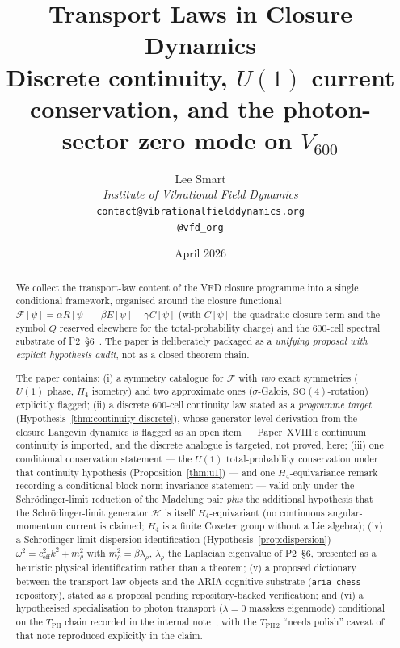 \documentclass[11pt]{article}
\title{Transport Laws in Closure Dynamics\\[6pt]
\large Discrete continuity, $U(1)$ current conservation, and the
photon-sector zero mode on $V_{600}$}
\author{%
  Lee Smart\\[4pt]
  \textit{Institute of Vibrational Field Dynamics}\\[2pt]
  \texttt{contact@vibrationalfielddynamics.org}\\[2pt]
  \texttt{@vfd\_org}%
}
\date{April 2026}
\theoremstyle{definition}
\newcommand{\Fcal}{\mathcal{F}}
\newcommand{\Hcal}{\mathcal{H}}
\begin{document}
\maketitle

\begin{abstract}
We collect the transport-law content of the VFD closure programme into a single conditional framework, organised around the closure functional $\Fcal[\psi] = \alpha R[\psi] + \beta E[\psi] - \gamma C[\psi]$ (with $C[\psi]$ the quadratic closure term and the symbol $Q$ reserved elsewhere for the total-probability charge) and the $600$-cell spectral substrate of P2~\S 6~\citep{CascadeAlgSubstrate}. The paper is deliberately packaged as a \emph{unifying proposal with explicit hypothesis audit}, not as a closed theorem chain.

The paper contains: (i) a symmetry catalogue for $\Fcal$ with \emph{two} exact symmetries ($U(1)$ phase, $H_4$ isometry) and two approximate ones ($\sigma$-Galois, $\mathrm{SO}(4)$-rotation) explicitly flagged; (ii) a discrete $600$-cell continuity law stated as a \emph{programme target} (Hypothesis~\ref{thm:continuity-discrete}), whose generator-level derivation from the closure Langevin dynamics is flagged as an open item --- Paper~XVIII's continuum continuity is imported, and the discrete analogue is targeted, not proved, here; (iii) one conditional conservation statement --- the $U(1)$ total-probability conservation under that continuity hypothesis (Proposition~\ref{thm:u1}) --- and one $H_4$-equivariance remark recording a conditional block-norm-invariance statement --- valid only under the Schr\"{o}dinger-limit reduction of the Madelung pair \emph{plus} the additional hypothesis that the Schr\"{o}dinger-limit generator $\Hcal$ is itself $H_4$-equivariant (no continuous angular-momentum current is claimed; $H_4$ is a finite Coxeter group without a Lie algebra); (iv) a Schr\"{o}dinger-limit dispersion identification (Hypothesis~\ref{prop:dispersion}) $\omega^2 = c_{\text{eff}}^2 k^2 + m_\rho^2$ with $m_\rho^2 = \beta\lambda_\rho$, $\lambda_\rho$ the Laplacian eigenvalue of P2~\S 6, presented as a heuristic physical identification rather than a theorem; (v) a proposed dictionary between the transport-law objects and the ARIA cognitive substrate (\texttt{aria-chess} repository), stated as a proposal pending repository-backed verification; and (vi) a hypothesised specialisation to photon transport ($\lambda = 0$ massless eigenmode) conditional on the $T_{\text{PH}}$ chain recorded in the internal note~\citep{CascadeAlphaChain}, with the $T_{\text{PH}\,2}$ ``needs polish'' caveat of that note reproduced explicitly in the claim.


\end{abstract}
\end{document}
